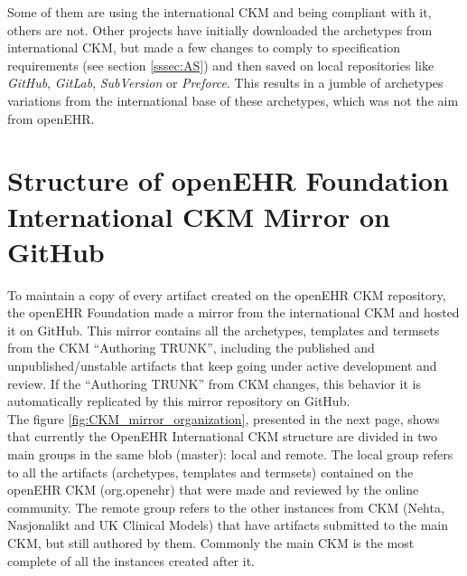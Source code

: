 \documentclass[mim_thesis.tex]{subfiles}
\begin{document}
Some of them are using the international CKM and being compliant with it, others are not. Other projects have initially downloaded the archetypes from international CKM, but made a few changes to comply to specification requirements (see section \ref{sssec:AS}) and then saved on local repositories like \textit{GitHub}, \textit{GitLab}, \textit{SubVersion} or \textit{Preforce}. This results in a jumble of archetypes variations from the international base of these archetypes, which was not the aim from openEHR. \\

\section{Structure of openEHR Foundation International CKM Mirror on GitHub}
To maintain a copy of every artifact created on the openEHR CKM repository, the openEHR Foundation made a mirror from the international CKM and hosted it on GitHub. This mirror contains all the archetypes, templates and termsets from the CKM “Authoring TRUNK”, including the published and unpublished/unstable artifacts that keep going under active development and review. If the “Authoring TRUNK” from CKM changes, this behavior it is automatically replicated by this mirror repository on GitHub. \\

The figure \ref{fig:CKM_mirror_organization}, presented in the next page, shows that currently the OpenEHR International CKM structure are divided in two main groups in the same blob (master): local and remote. The local group refers to all the artifacts (archetypes, templates and termsets) contained on the openEHR CKM (org.openehr) that were made and reviewed by the online community. The remote group refers to the other instances from CKM (Nehta, Nasjonalikt and UK Clinical Models) that have artifacts submitted to the main CKM, but still authored by them. Commonly the main CKM is the most complete of all the instances created after it. 

\vfill
~
\end{document}
